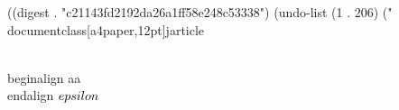 ((digest . "c21143fd2192da26a1ff58e248c53338") (undo-list (1 . 206) ("\\documentclass[a4paper,12pt]{jarticle}
\begin{document}
\\begin{align}
 aa
\\end{align}
$\\epsilon$
\
\end{document}
